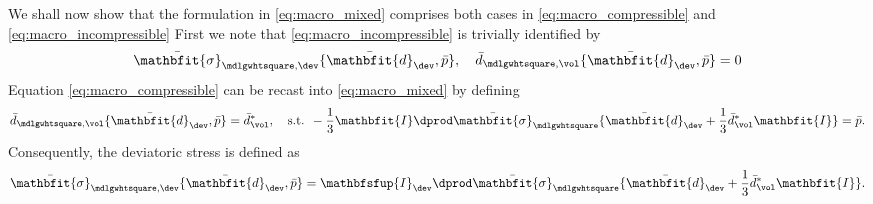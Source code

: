 \documentclass[a4paper,11pt]{article}
\renewcommand{\ts}[1]{\mathbfit{#1}}
\renewcommand{\tf}[1]{\mathbfsfup{#1}}
\renewcommand{\Box}{\mdlgwhtsquare}
\begin{document}
We shall now show that the formulation in \eqref{eq:macro_mixed} comprises both cases in \eqref{eq:macro_compressible} and \eqref{eq:macro_incompressible}
First we note that \eqref{eq:macro_incompressible} is trivially identified by 
\begin{align}
 \bar{\ts\sigma}_{\Box,\dev}\{\bar{\ts d}_\dev, \bar p\}, \quad \bar{d}_{\Box,\vol}\{\bar{\ts d}_\dev,\bar p\} = 0
\end{align}
Equation \eqref{eq:macro_compressible} can be recast into \eqref{eq:macro_mixed} by defining
\begin{align}
 \bar d_{\Box,\vol}\{\bar{\ts d}_\dev, \bar p\} = \bar{d}_\vol^*,\quad \text{s.t. } -\frac13 \ts I\dprod \bar{\ts\sigma}_\Box\{\bar{\ts d}_\dev +\frac13\bar{d}_\vol^*\ts I\} = \bar p.
\end{align}
Consequently, the deviatoric stress is defined as
\begin{align}
 \bar{\ts\sigma}_{\Box,\dev}\{\bar{\ts d}_\dev,\bar p\} = \tf I_\dev \dprod \bar{\ts\sigma}_\Box\{\bar{\ts d}_\dev + \frac13 \bar{d}_\vol^*\ts I\}.
\end{align}
\end{document}
